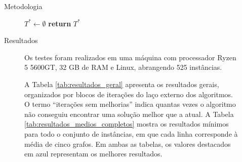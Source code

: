 \documentclass[portrait,a0paper,fontscale=0.285]{baposter} %
\begin{document}
\begin{poster}
\begin{posterbox}[name=metodologia,column=1,below=resumo,span=2]{Metodologia}
\begin{figure}[H]
\begin{minipage}{0.46\textwidth}
\begin{algorithm}[H]
$T^* \gets \emptyset$\;\label{lin:InicializacaoT*}
\textbf{return} $T^*$\;
\end{algorithm}
\vspace{-0.5em}
\end{minipage}
\end{figure}




\end{posterbox}

\begin{posterbox}[name=resultados,column=1,below=metodologia,span=2]{Resultados}


\begin{figure}[H]
\centering
\vspace{-1.2em}
\begin{minipage}[t]{0.48\textwidth}
    \small
Os testes foram realizados em uma máquina com processador Ryzen 5 5600GT, 32 GB de RAM e Linux, abrangendo 525 instâncias. 

A Tabela \ref{tab:resultados_geral} apresenta os resultados gerais, organizados por blocos de iterações do laço externo dos algoritmos. O termo “iterações sem melhorias” indica quantas vezes o algoritmo não conseguiu encontrar uma solução melhor que a atual. A Tabela \ref{tab:resultados_medios_completos} mostra os resultados mínimos para todo o conjunto de instâncias, em que cada linha corresponde à média de cinco grafos. Em ambas as tabelas, os valores destacados em azul representam os melhores resultados. 


\end{minipage}
\end{figure}
\end{posterbox}
\end{poster}
\end{document}
